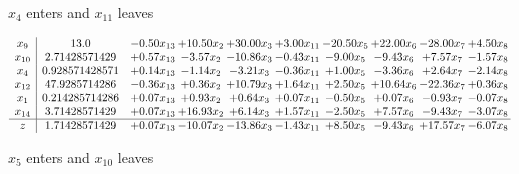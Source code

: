 \documentclass[9pt]{article}
\begin{document}
 $ x_{4} $ enters and $ x_{11} $ leaves 

 \[\begin{array}{c| c c@{\hskip 2pt} c@{\hskip 2pt} c@{\hskip 2pt} c@{\hskip 2pt} c@{\hskip 2pt} c@{\hskip 2pt} c@{\hskip 2pt} c@{\hskip 2pt} }
 x_{9}   &  13.0 & -0.50 x_{13} & + 10.50 x_{2} & + 30.00 x_{3} & +  3.00 x_{11} & -20.50 x_{5} & + 22.00 x_{6} & -28.00 x_{7} & +  4.50 x_{8}\\
 x_{10}   &  2.71428571429 & +  0.57 x_{13} & -3.57 x_{2} & -10.86 x_{3} & -0.43 x_{11} & -9.00 x_{5} & -9.43 x_{6} & +  7.57 x_{7} & -1.57 x_{8}\\
 x_{4}   &  0.928571428571 & +  0.14 x_{13} & -1.14 x_{2} & -3.21 x_{3} & -0.36 x_{11} & +  1.00 x_{5} & -3.36 x_{6} & +  2.64 x_{7} & -2.14 x_{8}\\
 x_{12}   &  47.9285714286 & -0.36 x_{13} & +  0.36 x_{2} & + 10.79 x_{3} & +  1.64 x_{11} & +  2.50 x_{5} & + 10.64 x_{6} & -22.36 x_{7} & +  0.36 x_{8}\\
 x_{1}   &  0.214285714286 & +  0.07 x_{13} & +  0.93 x_{2} & +  0.64 x_{3} & +  0.07 x_{11} & -0.50 x_{5} & +  0.07 x_{6} & -0.93 x_{7} & -0.07 x_{8}\\
 x_{14}   &  3.71428571429 & +  0.07 x_{13} & + 16.93 x_{2} & +  6.14 x_{3} & +  1.57 x_{11} & -2.50 x_{5} & +  7.57 x_{6} & -9.43 x_{7} & -3.07 x_{8}\\
\hline
z    &  1.71428571429 & +  0.07 x_{13} & -10.07 x_{2} & -13.86 x_{3} & -1.43 x_{11} & +  8.50 x_{5} & -9.43 x_{6} & + 17.57 x_{7} & -6.07 x_{8}\\
\end{array}\]


 $ x_{5} $ enters and $ x_{10} $ leaves 
\end{document}
